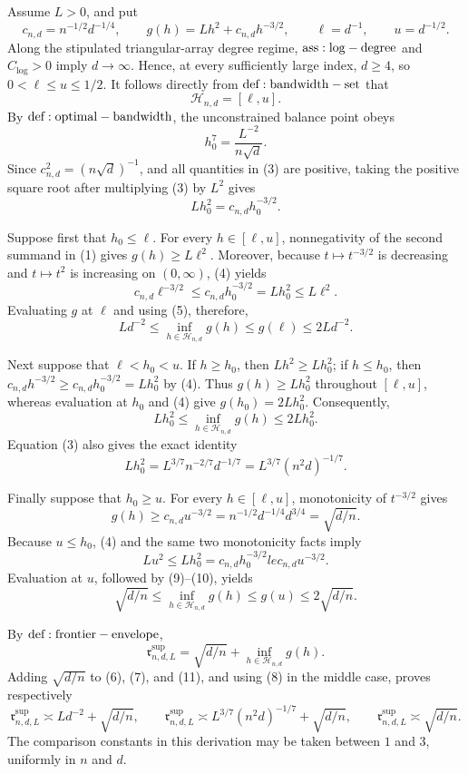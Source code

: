 Assume \(L>0\), and put
\[
 c_{n,d}=n^{-1/2}d^{-1/4},\qquad
 g(h)=Lh^2+c_{n,d}h^{-3/2},\qquad
 \ell=d^{-1},\qquad u=d^{-1/2}.
\tag{1}
\]
Along the stipulated triangular-array degree regime, \({\rm ass:log-degree}\) and \(C_{\log}>0\) imply \(d\to\infty\).  Hence, at every sufficiently large index, \(d\ge4\), so \(0<\ell\le u\le1/2\).  It follows directly from \({\rm def:bandwidth-set}\) that
\[
 \mathcal H_{n,d}=[\ell,u].
\tag{2}
\]
By \({\rm def:optimal-bandwidth}\), the unconstrained balance point obeys
\[
 h_0^7=\frac{L^{-2}}{n\sqrt d}.
\tag{3}
\]
Since \(c_{n,d}^2=(n\sqrt d)^{-1}\), and all quantities in (3) are positive, taking the positive square root after multiplying (3) by \(L^2\) gives
\[
 Lh_0^2=c_{n,d}h_0^{-3/2}.
\tag{4}
\]

Suppose first that \(h_0\le\ell\).  For every \(h\in[\ell,u]\), nonnegativity of the second summand in (1) gives \(g(h)\ge L\ell^2\).  Moreover, because \(t\mapsto t^{-3/2}\) is decreasing and \(t\mapsto t^2\) is increasing on \((0,\infty)\), (4) yields
\[
 c_{n,d}\ell^{-3/2}
 \le c_{n,d}h_0^{-3/2}
 =Lh_0^2
 \le L\ell^2.
\tag{5}
\]
Evaluating \(g\) at \(\ell\) and using (5), therefore,
\[
 Ld^{-2}
 \le \inf_{h\in\mathcal H_{n,d}}g(h)
 \le g(\ell)
 \le 2Ld^{-2}.
\tag{6}
\]

Next suppose that \(\ell<h_0<u\).  If \(h\ge h_0\), then \(Lh^2\ge Lh_0^2\); if \(h\le h_0\), then \(c_{n,d}h^{-3/2}\ge c_{n,d}h_0^{-3/2}=Lh_0^2\) by (4).  Thus \(g(h)\ge Lh_0^2\) throughout \([\ell,u]\), whereas evaluation at \(h_0\) and (4) give \(g(h_0)=2Lh_0^2\).  Consequently,
\[
 Lh_0^2
 \le \inf_{h\in\mathcal H_{n,d}}g(h)
 \le 2Lh_0^2.
\tag{7}
\]
Equation (3) also gives the exact identity
\[
 Lh_0^2=L^{3/7}n^{-2/7}d^{-1/7}
 =L^{3/7}(n^2d)^{-1/7}.
\tag{8}
\]

Finally suppose that \(h_0\ge u\).  For every \(h\in[\ell,u]\), monotonicity of \(t^{-3/2}\) gives
\[
 g(h)\ge c_{n,d}u^{-3/2}
 =n^{-1/2}d^{-1/4}d^{3/4}
 =\sqrt{d/n}.
\tag{9}
\]
Because \(u\le h_0\), (4) and the same two monotonicity facts imply
\[
 Lu^2\le Lh_0^2=c_{n,d}h_0^{-3/2}le c_{n,d}u^{-3/2}.
\tag{10}
\]
Evaluation at \(u\), followed by (9)--(10), yields
\[
 \sqrt{d/n}
 \le \inf_{h\in\mathcal H_{n,d}}g(h)
 \le g(u)
 \le 2\sqrt{d/n}.
\tag{11}
\]

By \({\rm def:frontier-envelope}\),
\[
 \mathfrak r^{\mathrm{sup}}_{n,d,L}
 =\sqrt{d/n}+\inf_{h\in\mathcal H_{n,d}}g(h).
\tag{12}
\]
Adding \(\sqrt{d/n}\) to (6), (7), and (11), and using (8) in the middle case, proves respectively
\[
 \mathfrak r^{\mathrm{sup}}_{n,d,L}
 \asymp Ld^{-2}+\sqrt{d/n},
 \qquad
 \mathfrak r^{\mathrm{sup}}_{n,d,L}
 \asymp L^{3/7}(n^2d)^{-1/7}+\sqrt{d/n},
 \qquad
 \mathfrak r^{\mathrm{sup}}_{n,d,L}
 \asymp\sqrt{d/n}.
\tag{13}
\]
The comparison constants in this derivation may be taken between \(1\) and \(3\), uniformly in \(n\) and \(d\).

